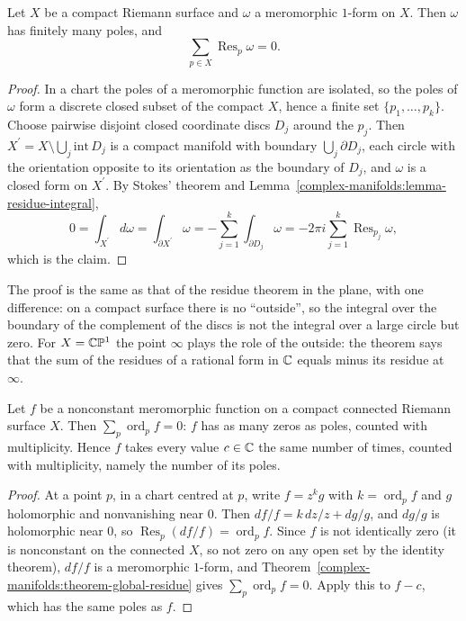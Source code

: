\begin{theorem}\label{complex-manifolds:theorem-global-residue}
Let $X$ be a compact Riemann surface and $\omega$ a meromorphic $1$-form on $X$. Then $\omega$ has finitely many poles, and
\[
\sum_{p \in X}\operatorname{Res}_p\omega = 0 .
\]
\end{theorem}

\begin{proof}
In a chart the poles of a meromorphic function are isolated, so the poles of $\omega$ form a discrete closed subset of the compact $X$, hence a finite set $\{p_1, \ldots, p_k\}$. Choose pairwise
disjoint closed coordinate discs $D_j$ around the $p_j$. Then $X^{\prime} = X \setminus \bigcup_j\mathrm{int}\,D_j$ is a compact manifold with boundary $\bigcup_j\partial D_j$, each circle with the
orientation opposite to its orientation as the boundary of $D_j$, and $\omega$ is a closed form on $X^{\prime}$. By Stokes' theorem and Lemma~\ref{complex-manifolds:lemma-residue-integral},
\[
0 = \int_{X^{\prime}}d\omega = \int_{\partial X^{\prime}}\omega = -\sum_{j=1}^k\int_{\partial D_j}\omega = -2\pi i\sum_{j=1}^k\operatorname{Res}_{p_j}\omega,
\]
which is the claim.
\end{proof}

The proof is the same as that of the residue theorem in the plane, with one difference: on a compact surface there is no ``outside'', so the integral over the boundary of the complement of the
discs is not the integral over a large circle but zero. For $X = \mathbb{C}\mathbb{P}^1$ the point $\infty$ plays the role of the outside: the theorem says that the sum of the residues of a rational form in $\mathbb{C}$
equals minus its residue at $\infty$.

\begin{corollary}\label{complex-manifolds:corollary-zeros-poles}
Let $f$ be a nonconstant meromorphic function on a compact connected Riemann surface $X$. Then $\sum_p\operatorname{ord}_pf = 0$: $f$ has as many zeros as poles, counted with multiplicity. Hence $f$
takes every value $c \in \mathbb{C}$ the same number of times, counted with multiplicity, namely the number of its poles.
\end{corollary}

\begin{proof}
At a point $p$, in a chart centred at $p$, write $f = z^kg$ with $k = \operatorname{ord}_pf$ and $g$ holomorphic and nonvanishing near $0$. Then $df/f = k\,dz/z + dg/g$, and $dg/g$ is holomorphic near $0$,
so $\operatorname{Res}_p(df/f) = \operatorname{ord}_pf$. Since $f$ is not identically zero (it is nonconstant on the connected $X$, so not zero on any open set by the identity theorem), $df/f$ is a meromorphic
$1$-form, and Theorem~\ref{complex-manifolds:theorem-global-residue} gives $\sum_p\operatorname{ord}_pf = 0$. Apply this to $f - c$, which has the same poles as $f$.
\end{proof}

